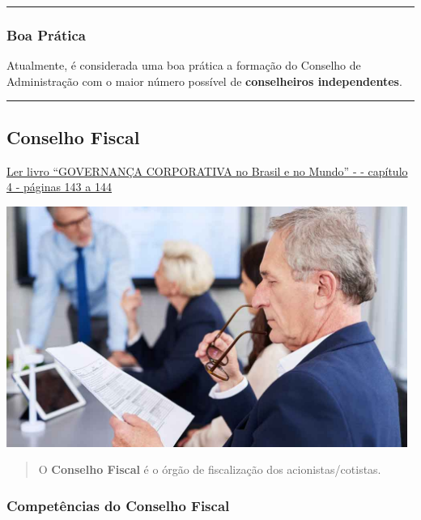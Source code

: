 \documentclass[
]{book}
\begin{document}
\begin{center}\rule{0.5\linewidth}{0.5pt}\end{center}

\subsubsection{Boa Prática}\label{boa-pruxe1tica}

Atualmente, é considerada uma boa prática a formação do Conselho de Administração com o maior número possível de \textbf{conselheiros independentes}.

\begin{center}\rule{0.5\linewidth}{0.5pt}\end{center}

\subsection{Conselho Fiscal}\label{conselho-fiscal}

\href{https://pdfcoffee.com/governana-corporativa-no-brasil-e-no-mundo-pdf-free.html}{Ler livro ``GOVERNANÇA CORPORATIVA no Brasil e no Mundo'' - - capítulo 4 - páginas 143 a 144}

\includegraphics[width=5.15625in,height=\textheight]{images/04-2025-08-26_27/02-conselho_fiscal.jpg}

\begin{quote}
O \textbf{Conselho Fiscal} é o órgão de fiscalização dos acionistas/cotistas.
\end{quote}

\subsubsection{Competências do Conselho Fiscal}\label{competuxeancias-do-conselho-fiscal}
\end{document}
